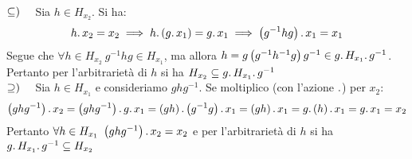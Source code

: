 \begin{demonstration}~{}\\
$\subseteq)\quad$ Sia $h\in H_{x_2}$. Si ha:
\begin{equation*}
h\ldotp x_2 = x_2\implies h\ldotp\left(g\ldotp x_1\right) = g\ldotp x_1 \implies \left(g^{-1} h g\right)\ldotp x_1 = x_1
\end{equation*}
Segue che $\forall h\in H_{x_2}\ g^{-1} h g\in H_{x_1}$, ma allora $h = g \left(g^{-1} h^{-1} g\right) g^{-1}\in g\ldotp H_{x_1}\ldotp g^{-1}$.
Pertanto per l'arbitrarietà di $h$ si ha $H_{x_2} \subseteq g \ldotp H_{x_1}\ldotp g^{-1} $\\
$\supseteq)\quad$ Sia $h\in H_{x_1}$ e consideriamo $ghg^{-1}$. Se moltiplico (con l'azione $\ldotp$) per $x_2$:
\begin{equation*}
\left(ghg^{-1}\right)\ldotp x_2=\left(ghg^{-1}\right)\ldotp g\ldotp x_1=\left(gh\right)\ldotp \left(g^{-1}g\right)\ldotp x_1=\left(gh\right)\ldotp x_1=g\ldotp\left(h\right)\ldotp x_1=g\ldotp x_1=x_2
\end{equation*}
Pertanto $\forall h\in H_{x_1}\ \left(ghg^{-1}\right)\ldotp x_2= x_2$ e per l'arbitrarietà di $h$ si ha $g\ldotp H_{x_1}\ldotp g^{-1}\subseteq H_{x_2}$
\end{demonstration}
